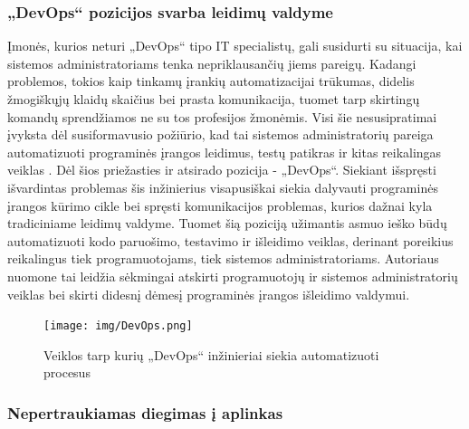 \documentclass{VUMIFPSkursinis}
\begin{document}
    \subsubsection{„DevOps“ pozicijos svarba leidimų valdyme}

Įmonės, kurios neturi „DevOps“ tipo IT specialistų, gali susidurti su situacija, kai sistemos administratoriams tenka nepriklausančių jiems pareigų. Kadangi problemos, tokios kaip tinkamų įrankių automatizacijai trūkumas, didelis žmogiškųjų klaidų skaičius bei prasta komunikacija, tuomet tarp skirtingų komandų sprendžiamos ne su tos profesijos žmonėmis. Visi šie nesusipratimai įvyksta dėl susiformavusio požiūrio, kad tai sistemos administratorių pareiga automatizuoti programinės įrangos leidimus, testų patikras ir kitas reikalingas veiklas \cite{SaltTrecias}. Dėl šios priežasties ir atsirado pozicija - „DevOps“. Siekiant išspręsti išvardintas problemas šis inžinierius visapusiškai siekia dalyvauti programinės įrangos kūrimo cikle bei spręsti komunikacijos problemas, kurios dažnai kyla tradiciniame leidimų valdyme. Tuomet šią poziciją užimantis asmuo ieško būdų automatizuoti kodo paruošimo, testavimo ir išleidimo veiklas, derinant poreikius reikalingus tiek programuotojams, tiek sistemos administratoriams. Autoriaus nuomone tai leidžia sėkmingai atskirti programuotojų ir sistemos administratorių veiklas bei skirti didesnį dėmesį programinės įrangos išleidimo valdymui.

\begin{figure}[H]
    \centering
    \texttt{[image: img/DevOps.png]}
    \caption{Veiklos tarp kurių „DevOps“ inžinieriai siekia automatizuoti procesus}
    \label{img:mlp}
\end{figure}

    \subsubsection{Nepertraukiamas diegimas į aplinkas}
    
\end{document}
